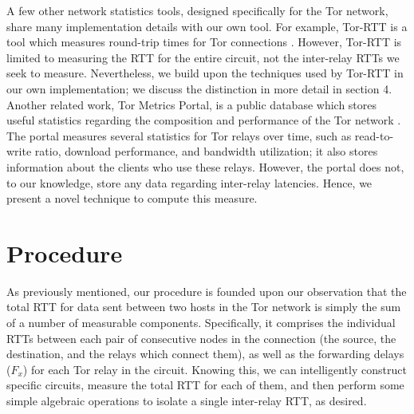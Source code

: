 \documentclass[twocolumn,11pt]{article}
\begin{document}
A few other network statistics tools, designed specifically for the Tor network, share many implementation details with our own tool. For example, Tor-RTT is a tool which measures round-trip times for Tor connections \cite{Tor_RTT}. However, Tor-RTT is limited to measuring the RTT for the entire circuit, not the inter-relay RTTs we seek to measure. Nevertheless, we build upon the techniques used by Tor-RTT in our own implementation; we discuss the distinction in more detail in section 4. Another related work, Tor Metrics Portal, is a public database which stores useful statistics regarding the composition and performance of the Tor network \cite{Tor_Metrics_Portal}. The portal measures several statistics for Tor relays over time, such as read-to-write ratio, download performance, and bandwidth utilization; it also stores information about the clients who use these relays. However, the portal does not, to our knowledge, store any data regarding inter-relay latencies. Hence, we present a novel technique to compute this measure.

\section{Procedure}

As previously mentioned, our procedure is founded upon our observation that the total RTT for data sent between two hosts in the Tor network is simply the sum of a number of measurable components. Specifically, it comprises the individual RTTs between each pair of consecutive nodes in the connection (the source, the destination, and the relays which connect them), as well as the forwarding delays ($F_x$) for each Tor relay in the circuit. Knowing this, we can intelligently construct specific circuits, measure the total RTT for each of them, and then perform some simple algebraic operations to isolate a single inter-relay RTT, as desired.


\end{document}

